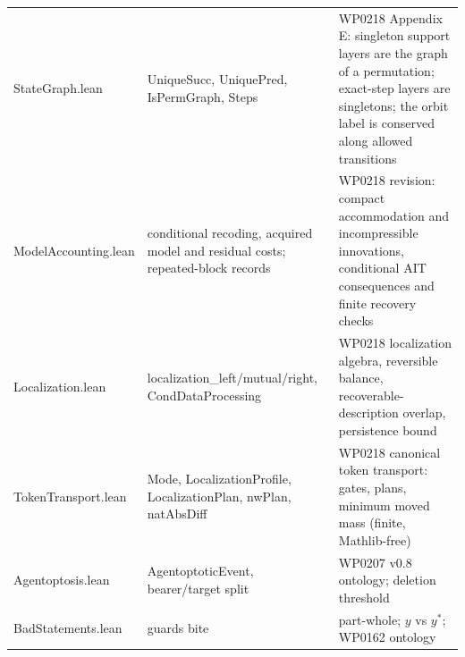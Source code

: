 \documentclass[11pt,a4paper]{article}
\newcommand{\lean}[1]{{\ttfamily\small
  \let\leanunderscore\_\def\_{\leanunderscore\allowbreak}#1}}
\begin{document}
{\begin{longtable}{@{}p{4.4cm}p{5.0cm}p{5.0cm}@{}}
\lean{StateGraph.lean} & \lean{UniqueSucc}, \lean{UniquePred}, \lean{IsPermGraph}, \lean{Steps} & WP0218 Appendix E: singleton support layers are the graph of a permutation; exact-step layers are singletons; the orbit label is conserved along allowed transitions \\
\lean{ModelAccounting.lean} & conditional recoding, acquired model and residual costs; repeated-block records & WP0218 revision: compact accommodation and incompressible innovations, conditional AIT consequences and finite recovery checks \\
\lean{Localization.lean} & \lean{localization\_left/mutual/right}, \lean{CondDataProcessing} & WP0218 localization algebra, reversible balance, recoverable-description overlap, persistence bound \\
\lean{TokenTransport.lean} & \lean{Mode}, \lean{LocalizationProfile}, \lean{LocalizationPlan}, \lean{nwPlan}, \lean{natAbsDiff} & WP0218 canonical token transport: gates, plans, minimum moved mass (finite, Mathlib-free) \\
\lean{Agentoptosis.lean} & \lean{AgentoptoticEvent}, bearer/target split & WP0207 v0.8 ontology; deletion threshold \\
\lean{BadStatements.lean} & guards bite & part-whole; $y$ vs $y^\ast$; WP0162 ontology \\
\bottomrule
\end{longtable}}
\end{document}
